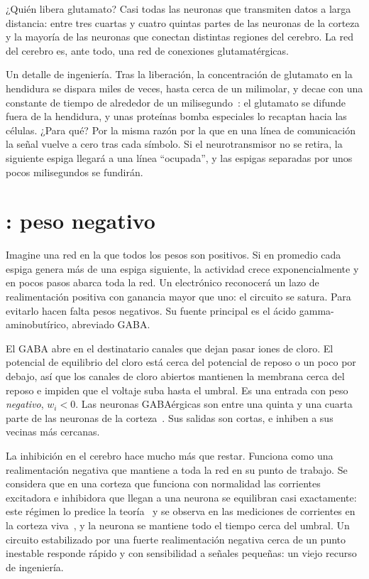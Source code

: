 ¿Quién libera glutamato? Casi todas las neuronas que transmiten datos a larga distancia: entre tres cuartas y cuatro quintas partes de las neuronas de la corteza y la mayoría de las neuronas que conectan distintas regiones del cerebro. La red del cerebro es, ante todo, una red de conexiones glutamatérgicas.

Un detalle de ingeniería. Tras la liberación, la concentración de glutamato en la hendidura se dispara miles de veces, hasta cerca de un milimolar, y decae con una constante de tiempo de alrededor de un milisegundo~\cite{Clements1992}: el glutamato se difunde fuera de la hendidura, y unas proteínas bomba especiales lo recaptan hacia las células. ¿Para qué? Por la misma razón por la que en una línea de comunicación la señal vuelve a cero tras cada símbolo. Si el neurotransmisor no se retira, la siguiente espiga llegará a una línea “ocupada”, y las espigas separadas por unos pocos milisegundos se fundirán.

\section{: peso negativo}

Imagine una red en la que todos los pesos son positivos. Si en promedio cada espiga genera más de una espiga siguiente, la actividad crece exponencialmente y en pocos pasos abarca toda la red. Un electrónico reconocerá un lazo de realimentación positiva con ganancia mayor que uno: el circuito se satura. Para evitarlo hacen falta pesos negativos. Su fuente principal es el ácido gamma-aminobutírico, abreviado GABA.

El GABA abre en el destinatario canales que dejan pasar iones de cloro. El potencial de equilibrio del cloro está cerca del potencial de reposo o un poco por debajo, así que los canales de cloro abiertos mantienen la membrana cerca del reposo e impiden que el voltaje suba hasta el umbral. Es una entrada con peso \emph{negativo}, $w_i<0$. Las neuronas GABAérgicas son entre una quinta y una cuarta parte de las neuronas de la corteza~\cite{Hendry1987}. Sus salidas son cortas, e inhiben a sus vecinas más cercanas.

La inhibición en el cerebro hace mucho más que restar. Funciona como una realimentación negativa que mantiene a toda la red en su punto de trabajo. Se considera que en una corteza que funciona con normalidad las corrientes excitadora e inhibidora que llegan a una neurona se equilibran casi exactamente: este régimen lo predice la teoría~\cite{vanVreeswijk1996} y se observa en las mediciones de corrientes en la corteza viva~\cite{Haider2006}, y la neurona se mantiene todo el tiempo cerca del umbral. Un circuito estabilizado por una fuerte realimentación negativa cerca de un punto inestable responde rápido y con sensibilidad a señales pequeñas: un viejo recurso de ingeniería.

